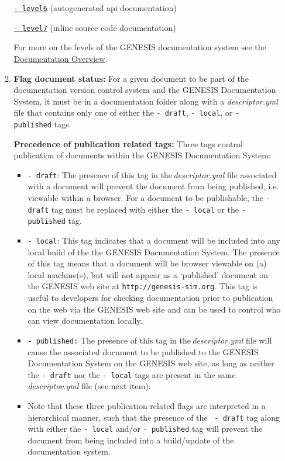 \documentclass[12pt]{article}
\begin{document}
\begin{enumerate}
\begin{enumerate}
\href{../contents-level6/contents-level6.tex}{{\tt - level6}} (autogenerated api documentation)

\href{../contents-level7/contents-level7.tex}{{\tt - level7}} (inline source code documentation)

For more on the levels of the GENESIS documentation system see the \href{../documentation-overview/documentation-overview.tex}{Documentation Overview}.

\item {\bf Flag document status:} For a given document to be part of the documentation version control system and the GENESIS Documentation System, it must be in a documentation folder along with a {\it descriptor.yml} file that contains only one of either the {\tt -\,draft}, {\tt -\,local}, or {\tt -\,published} tags.

{\bf Precedence of publication related tags:} Three tags control publication of documents within the GENESIS Documentation System:
\begin{itemize}
	\item[]{\tt -\,draft}: The presence of this tag in the\,{\it descriptor.yml} file associated with a document will prevent the document 
	from being published,  i.e. viewable within a browser. For a document to be publishable, the {\tt -\,draft} tag must be replaced 
	with either the {\tt -\,local} or the {\tt -\,published} tag.
	
	\item[]{\tt -\,local}: This tag indicates that a document will be included into any local build of the the GENESIS Documentation 
	System. The presence of this tag means that a document will be browser viewable on (a) local machine(s), but will not appear as a `published' 
	document on the GENESIS web site at {\tt http://genesis-sim.org}. This tag is useful to developers for checking documentation prior to publication on the web via the GENESIS web site and can be used to control who can view documentation locally.
	
	\item[]{\tt -\,published:} The presence of this tag in the\,{\it descriptor.yml} file will cause the associated document to be published to the GENESIS Documentation System on the GENESIS web site, as long as neither the {\tt -\,draft} nor the {\tt -\,local} tags are present in the same\,{\it descriptor.yml} file (see next item).
	
	\item[]Note that these three publication related flags are interpreted in a hierarchical manner, such that the presence of the {\tt 
	-\,draft} tag along with either the {\tt -\,local} and/or {\tt -\,published} tag will prevent the document from being included into a 
	build/update of the documentation system.
		

\end{itemize}
\end{enumerate}
\end{enumerate}
\end{document}
